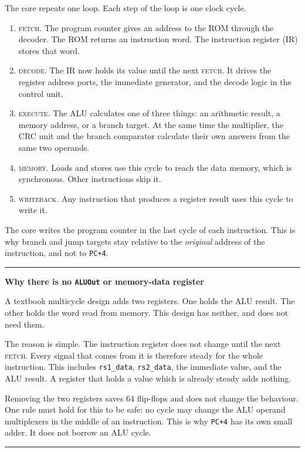 \documentclass[11pt,a4paper]{article}
\newenvironment{callout}[1]{%
  \par\penalty-150\vspace{6pt}%
  \begin{center}\begin{minipage}{0.965\linewidth}%
  \textcolor{rvbl}{\rule{\linewidth}{0.9pt}}\par\vspace{1pt}%
  {\color{rvbl}\bfseries #1}\par\vspace{2pt}\small\ignorespaces}%
 {\par\vspace{3pt}\textcolor{rvbl}{\rule{\linewidth}{0.9pt}}%
  \end{minipage}\end{center}\vspace{4pt}\par}
\begin{document}
The core repeats one loop. Each step of the loop is one clock cycle.

\begin{enumerate}[leftmargin=1.5em,itemsep=1pt,topsep=2pt]
\item \textsc{fetch}. The program counter gives an address to the ROM through the decoder.
  The ROM returns an instruction word. The instruction register (IR) stores that word.
\item \textsc{decode}. The IR now holds its value until the next \textsc{fetch}. It drives
  the register address ports, the immediate generator, and the decode logic in the control
  unit.
\item \textsc{execute}. The ALU calculates one of three things: an arithmetic result, a
  memory address, or a branch target. At the same time the multiplier, the CRC unit and the
  branch comparator calculate their own answers from the same two operands.
\item \textsc{memory}. Loads and stores use this cycle to reach the data memory, which is
  synchronous. Other instructions skip it.
\item \textsc{writeback}. Any instruction that produces a register result uses this cycle to
  write it.
\end{enumerate}

The core writes the program counter in the last cycle of each instruction. This is why
branch and jump targets stay relative to the \emph{original} address of the instruction, and
not to \texttt{PC+4}.

\begin{callout}{Why there is no \texttt{ALUOut} or memory-data register}
A textbook multicycle design adds two registers. One holds the ALU result. The other holds
the word read from memory. This design has neither, and does not need them.

The reason is simple. The instruction register does not change until the next
\textsc{fetch}. Every signal that comes from it is therefore steady for the whole
instruction. This includes \texttt{rs1\_data}, \texttt{rs2\_data}, the immediate value, and
the ALU result. A register that holds a value which is already steady adds nothing.

Removing the two registers saves 64 flip-flops and does not change the behaviour. One rule
must hold for this to be safe: no cycle may change the ALU operand multiplexers in the
middle of an instruction. This is why \texttt{PC+4} has its own small adder. It does not
borrow an ALU cycle.
\end{callout}
\end{document}

